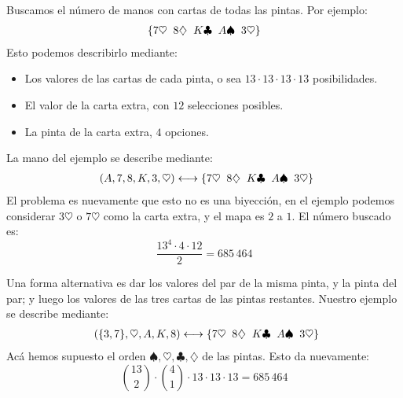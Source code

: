   Buscamos el número de manos con cartas de todas las pintas.
  Por ejemplo:
  \begin{equation*}
    \begin{array}{@{\{}*{4}{c@{\;\;}}c@{\}}}
      7 \heartsuit & 8 \diamondsuit & K \clubsuit &
	A \spadesuit & 3 \heartsuit
    \end{array}
  \end{equation*}
  Esto podemos describirlo mediante:
  \begin{itemize}
  \item
    Los valores de las cartas de cada pinta,
    o sea \(13 \cdot 13 \cdot 13 \cdot 13\) posibilidades.
  \item
    El valor de la carta extra,
    con \(12\) selecciones posibles.
  \item
    La pinta de la carta extra,
    \(4\) opciones.
  \end{itemize}
  La mano del ejemplo se describe mediante:
  \begin{equation*}
    \begin{array}{l@{{} \longleftrightarrow \{}*{4}{c@{\;\;}}c@{\}}}
      (A, 7, 8, K, 3, \heartsuit) &
	 7 \heartsuit & 8 \diamondsuit & K \clubsuit &
	 A \spadesuit & 3 \heartsuit
    \end{array}
  \end{equation*}
  El problema es nuevamente que esto no es una biyección,
  en el ejemplo podemos considerar \(3\heartsuit\) o \(7\heartsuit\)
  como la carta extra,
  y el mapa es \(2\) a \(1\).
  El número buscado es:
  \begin{equation*}
    \frac{13^4 \cdot 4 \cdot 12}{2}
      = 685\,464
  \end{equation*}

  Una forma alternativa
  es dar los valores del par de la misma pinta,
  y la pinta del par;
  y luego los valores de las tres cartas de las pintas restantes.
  Nuestro ejemplo se describe mediante:
  \begin{equation*}
    \begin{array}{l@{{} \longleftrightarrow \{}*{4}{c@{\;\;}}c@{\}}}
      (\{3, 7\}, \heartsuit, A, K, 8) &
	 7 \heartsuit & 8 \diamondsuit & K \clubsuit &
	 A \spadesuit & 3 \heartsuit
    \end{array}
  \end{equation*}
  Acá hemos supuesto
  el orden \(\spadesuit, \heartsuit, \clubsuit, \diamondsuit\)
  de las pintas.
  Esto da nuevamente:
  \begin{equation*}
    \binom{13}{2} \cdot \binom{4}{1} \cdot 13 \cdot 13 \cdot 13
      = 685\,464
  \end{equation*}

